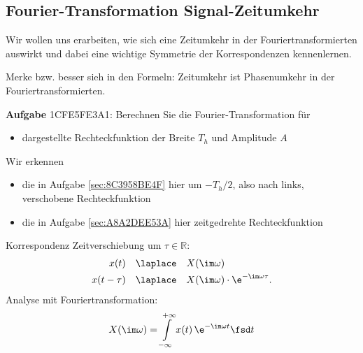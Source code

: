 \clearpage
\subsection{Fourier-Transformation Signal-Zeitumkehr}
\label{sec:1CFE5FE3A1}
\begin{Ziel}
Wir wollen uns erarbeiten, wie sich eine Zeitumkehr in der Fouriertransformierten
auswirkt und dabei eine wichtige Symmetrie der Korrespondenzen kennenlernen.

Merke bzw. besser sieh in den Formeln: Zeitumkehr ist Phasenumkehr in der Fouriertransformierten.
\end{Ziel}

\textbf{Aufgabe} {\tiny 1CFE5FE3A1}: Berechnen Sie die Fourier-Transformation für
\begin{itemize}
\item dargestellte Rechteckfunktion der Breite $T_h$ und Amplitude $A$
\end{itemize}
%
\begin{figure}[h!]
\centering
{}
\end{figure}
%
Wir erkennen
\begin{itemize}
\item die in Aufgabe \ref{sec:8C3958BE4F} hier um $-T_h/2$, also nach links,
verschobene Rechteckfunktion
\item die in Aufgabe \ref{sec:A8A2DEE53A} hier zeitgedrehte Rechteckfunktion
\end{itemize}

\begin{Werkzeug}
Korrespondenz Zeitverschiebung um $\tau\in\mathbb{R}$:
\begin{align}
x(t) & \quad \laplace \quad X(\im\omega)\\
x(t - \tau) & \quad \laplace \quad X(\im\omega) \cdot \e^{-\im\omega \tau}.
\end{align}
Analyse mit Fouriertransformation:
\begin{align}
X(\im \omega) = \int\limits_{-\infty}^{+\infty} x(t) \, \e^{-\im \omega t} \fsd t
\end{align}
\end{Werkzeug}

